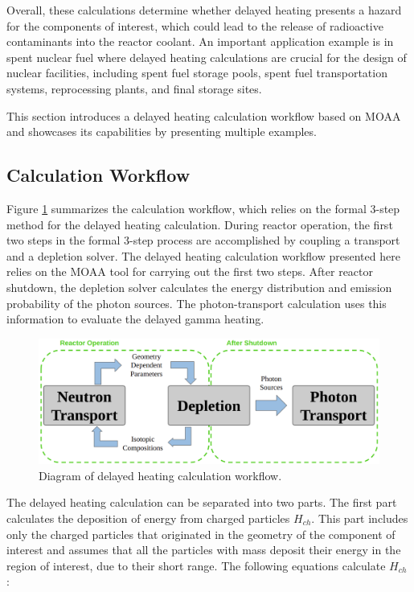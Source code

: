 Overall, these calculations determine whether delayed heating presents a hazard for the components of interest, which could lead to the release of radioactive contaminants into the reactor coolant.
An important application example is in spent nuclear fuel where delayed heating calculations are crucial for the design of nuclear facilities, including spent fuel storage pools, spent fuel transportation systems, reprocessing plants, and final storage sites.

This section introduces a delayed heating calculation workflow based on MOAA and showcases its capabilities by presenting multiple examples.

\subsection{Calculation Workflow}
\label{sec:delheat}

Figure \ref{fig:workflow_0} summarizes the calculation workflow, which relies on the formal 3-step method for the delayed heating calculation.
During reactor operation, the first two steps in the formal 3-step process are accomplished by coupling a transport and a depletion solver.
The delayed heating calculation workflow presented here relies on the \gls*{MOAA} tool \cite{fairhurst_development_2022} for carrying out the first two steps.
After reactor shutdown, the depletion solver calculates the energy distribution and emission probability of the photon sources.
The photon-transport calculation uses this information to evaluate the delayed gamma heating.

\begin{figure}[htbp!]
  \begin{center}
    \includegraphics[width=0.80\linewidth]{figures/calc_w}
  \end{center}
  \caption{Diagram of delayed heating calculation workflow.}
  \label{fig:workflow_0}
\end{figure}

The delayed heating calculation can be separated into two parts.
The first part calculates the deposition of energy from charged particles $H_{ch}$.
This part includes only the charged particles that originated in the geometry of the component of interest and assumes that all the particles with mass deposit their energy in the region of interest, due to their short range.
The following equations calculate $H_{ch}$ \cite{giot_decay_2018, endf, peterson-droogh_current_2018}:

